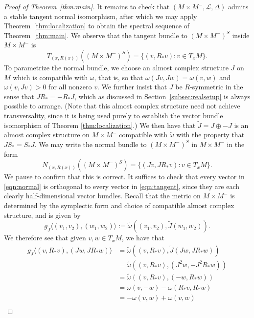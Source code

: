 \documentclass[11pt,reqno]{amsart}
\theoremstyle{definition}
\theoremstyle{remark}
\renewcommand{\tilde}{\widetilde}
\newcommand{\cL}{\mathcal{L}}
\numberwithin{equation}{section}
\begin{document}
\begin{proof}[Proof of Theorem~\ref{thm:main}]
It remains to check that $(M \times M^-, \cL, \Delta)$ admits a stable tangent normal isomorphism, after which we may apply Theorem~\ref{thm:localization} to obtain the spectral sequence of Theorem~\ref{thm:main}. We observe that the tangent bundle to $(M \times M^-)^{S}$ inside $M \times M^-$ is 
%
\begin{equation} \label{eqn:tangent} T_{(x, R(x))}((M\times M^-)^{S}) = \{ (v, R_*v) : v \in T_xM \}.\end{equation}
%
To parametrize the normal bundle, we choose an almost complex structure $J$ on $M$ which is compatible with $\omega$, that is, so that $\omega(Jv,Jw) = \omega(v,w)$ and $\omega(v,Jv) >0$ for all nonzero $v$. We further insist that $J$ be $R$-symmetric in the sense that $J R_* = -R_*J$, which as discussed in Section~\ref{subsec:realsetup} is always possible to arrange. (Note that this almost complex structure need not achieve transversality, since it is being used purely to establish the vector bundle isomorphism of Theorem \ref{thm:localization}.) We then have that $\tilde{J}=J \oplus -J$ is an almost complex structure on $M \times M^-$ compatible with $\tilde{\omega}$ with the property that $J S_* = S_* J$. We may write the normal bundle to $(M \times M^-)^{S}$ in $M \times M^-$ in the form
%
\begin{equation} \label{eqn:normal} N_{(x, R(x))}((M\times M^-)^{S}) = \{ (Jv, JR_*v) : v \in T_xM \}.\end{equation}
%
We pause to confirm that this is correct. It suffices to check that every vector in \eqref{eqn:normal} is orthogonal to every vector in \eqref{eqn:tangent}, since they are each clearly half-dimensional vector bundles. Recall that the metric on $M \times M^-$ is determined by the symplectic form and choice of compatible almost complex structure, and is given by
%
\[ g_{\tilde{J}} \langle(v_1,v_2), (w_1,w_2)\rangle := \tilde{\omega}((v_1,v_2), \tilde{J}(w_1,w_2)). \]
%
We therefore see that given $v,w \in T_xM$, we have that
%
\begin{align*}
g_{\tilde{J}} \langle (v, R_*v), (Jw, JR_*w) \rangle &= \tilde{\omega} ((v, R_* v), \tilde{J}(Jw, JR_*w)) \\
														&= \tilde{\omega}( (v, R_*v), (J^2 w, -J^2 R_*w)) \\
														&= \tilde{\omega} ( (v, R_* v), (-w, R_*w) ) \\
														&= \omega (v,-w) - \omega (R_* v, R_*w) \\
														&= -\omega(v,w) + \omega(v,w) \\

\end{align*}
\end{proof}
\end{document}

